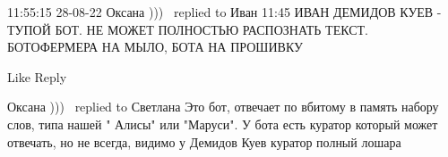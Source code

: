  
 
 
 
 

11:55:15 28-08-22
Оксана )))🌛🌟🌞replied to Иван
11:45
ИВАН ДЕМИДОВ КУЕВ - ТУПОЙ БОТ.
НЕ МОЖЕТ ПОЛНОСТЬЮ РАСПОЗНАТЬ ТЕКСТ.
БОТОФЕРМЕРА НА МЫЛО, БОТА НА ПРОШИВКУ 🤣🤣🤣

    Like
    Reply

Оксана )))🌛🌟🌞replied to Светлана
Это бот, отвечает по вбитому в память набору слов, типа нашей " Алисы" или "Маруси".
У бота есть куратор который может отвечать, но не всегда, видимо у Демидов Куев куратор полный лошара 🤣🤣🤣
